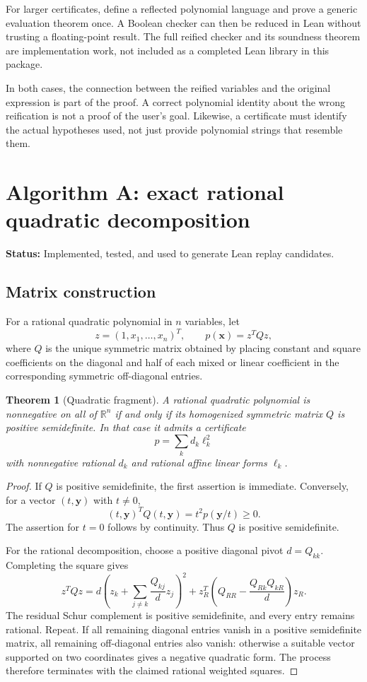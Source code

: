 \documentclass[11pt,a4paper]{article}
\newtheorem{theorem}[proposition]{Theorem}
\theoremstyle{definition}
\newcommand{\R}{\mathbb{R}}
\newcommand{\status}[1]{\textbf{Status:} #1.}
\begin{document}
For larger certificates, define a reflected polynomial language and prove a generic evaluation theorem once. A Boolean checker can then be reduced in Lean without trusting a floating-point result. The full reified checker and its soundness theorem are implementation work, not included as a completed Lean library in this package.

In both cases, the connection between the reified variables and the original expression is part of the proof. A correct polynomial identity about the wrong reification is not a proof of the user's goal. Likewise, a certificate must identify the actual hypotheses used, not just provide polynomial strings that resemble them.

\section{Algorithm A: exact rational quadratic decomposition}
\status{Implemented, tested, and used to generate Lean replay candidates}

\subsection{Matrix construction}

For a rational quadratic polynomial in $n$ variables, let
\[
 z=(1,x_1,\ldots,x_n)^T,\qquad p(\bm x)=z^TQz,
\]
where $Q$ is the unique symmetric matrix obtained by placing constant and square coefficients on the diagonal and half of each mixed or linear coefficient in the corresponding symmetric off-diagonal entries.

\begin{theorem}[Quadratic fragment]
A rational quadratic polynomial is nonnegative on all of $\R^n$ if and only if its homogenized symmetric matrix $Q$ is positive semidefinite. In that case it admits a certificate
\[
 p=\sum_k d_k\ell_k^2
\]
with nonnegative rational $d_k$ and rational affine linear forms $\ell_k$.
\end{theorem}
\begin{proof}
If $Q$ is positive semidefinite, the first assertion is immediate. Conversely, for a vector $(t,\bm y)$ with $t\ne0$,
\[
 (t,\bm y)^TQ(t,\bm y)=t^2p(\bm y/t)\ge0.
\]
The assertion for $t=0$ follows by continuity. Thus $Q$ is positive semidefinite.

For the rational decomposition, choose a positive diagonal pivot $d=Q_{kk}$. Completing the square gives
\[
 z^TQz=d\left(z_k+\sum_{j\ne k}\frac{Q_{kj}}d z_j\right)^2
    +z_R^T\left(Q_{RR}-\frac{Q_{Rk}Q_{kR}}d\right)z_R.
\]
The residual Schur complement is positive semidefinite, and every entry remains rational. Repeat. If all remaining diagonal entries vanish in a positive semidefinite matrix, all remaining off-diagonal entries also vanish: otherwise a suitable vector supported on two coordinates gives a negative quadratic form. The process therefore terminates with the claimed rational weighted squares.
\end{proof}
\end{document}
